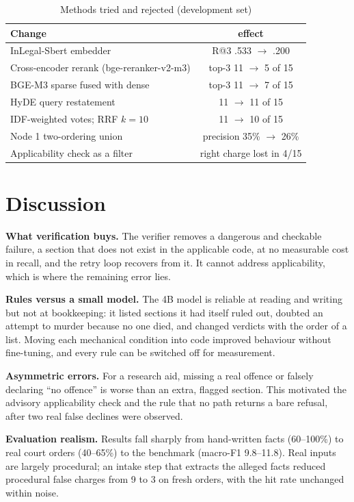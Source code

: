\documentclass[conference]{IEEEtran}
\begin{document}
\begin{table}[t]
\caption{Methods tried and rejected (development set)}
\label{tab:neg}
\centering
\begin{tabular}{lc}
\toprule
Change & effect\\
\midrule
InLegal-Sbert embedder & R@3 .533 $\rightarrow$ .200\\
Cross-encoder rerank (bge-reranker-v2-m3) & top-3 11 $\rightarrow$ 5 of 15\\
BGE-M3 sparse fused with dense & top-3 11 $\rightarrow$ 7 of 15\\
HyDE query restatement & 11 $\rightarrow$ 11 of 15\\
IDF-weighted votes; RRF $k{=}10$ & 11 $\rightarrow$ 10 of 15\\
Node 1 two-ordering union & precision 35\% $\rightarrow$ 26\%\\
Applicability check as a filter & right charge lost in 4/15\\
\bottomrule
\end{tabular}
\end{table}

\section{Discussion}
\textbf{What verification buys.} The verifier removes a dangerous and checkable failure, a section that does not exist in the applicable code, at no measurable cost in recall, and the retry loop recovers from it. It cannot address applicability, which is where the remaining error lies.

\textbf{Rules versus a small model.} The 4B model is reliable at reading and writing but not at bookkeeping: it listed sections it had itself ruled out, doubted an attempt to murder because no one died, and changed verdicts with the order of a list. Moving each mechanical condition into code improved behaviour without fine-tuning, and every rule can be switched off for measurement.

\textbf{Asymmetric errors.} For a research aid, missing a real offence or falsely declaring ``no offence'' is worse than an extra, flagged section. This motivated the advisory applicability check and the rule that no path returns a bare refusal, after two real false declines were observed.

\textbf{Evaluation realism.} Results fall sharply from hand-written facts (60--100\%) to real court orders (40--65\%) to the benchmark (macro-F1 9.8--11.8). Real inputs are largely procedural; an intake step that extracts the alleged facts reduced procedural false charges from 9 to 3 on fresh orders, with the hit rate unchanged within noise.
\end{document}
